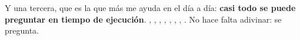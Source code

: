 Y una tercera, que es la que más me ayuda en el día a día: \textbf{casi todo se puede preguntar en tiempo de ejecución}. , , , , , , , . No hace falta adivinar: se pregunta.

